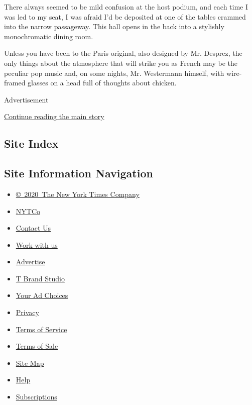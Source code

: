 There always seemed to be mild confusion at the host podium, and each
time I was led to my seat, I was afraid I'd be deposited at one of the
tables crammed into the narrow passageway. This hall opens in the back
into a stylishly monochromatic dining room.

Unless you have been to the Paris original, also designed by Mr.
Desprez, the only things about the atmosphere that will strike you as
French may be the peculiar pop music and, on some nights, Mr. Westermann
himself, with wire-framed glasses on a head full of thoughts about
chicken.

Advertisement

\protect\hyperlink{after-bottom}{Continue reading the main story}

\hypertarget{site-index}{%
\subsection{Site Index}\label{site-index}}

\hypertarget{site-information-navigation}{%
\subsection{Site Information
Navigation}\label{site-information-navigation}}

\begin{itemize}
\tightlist
\item
  \href{https://help.nytimes3xbfgragh.onion/hc/en-us/articles/115014792127-Copyright-notice}{©~2020~The
  New York Times Company}
\end{itemize}

\begin{itemize}
\tightlist
\item
  \href{https://www.nytco.com/}{NYTCo}
\item
  \href{https://help.nytimes3xbfgragh.onion/hc/en-us/articles/115015385887-Contact-Us}{Contact
  Us}
\item
  \href{https://www.nytco.com/careers/}{Work with us}
\item
  \href{https://nytmediakit.com/}{Advertise}
\item
  \href{http://www.tbrandstudio.com/}{T Brand Studio}
\item
  \href{https://www.nytimes3xbfgragh.onion/privacy/cookie-policy\#how-do-i-manage-trackers}{Your
  Ad Choices}
\item
  \href{https://www.nytimes3xbfgragh.onion/privacy}{Privacy}
\item
  \href{https://help.nytimes3xbfgragh.onion/hc/en-us/articles/115014893428-Terms-of-service}{Terms
  of Service}
\item
  \href{https://help.nytimes3xbfgragh.onion/hc/en-us/articles/115014893968-Terms-of-sale}{Terms
  of Sale}
\item
  \href{https://spiderbites.nytimes3xbfgragh.onion}{Site Map}
\item
  \href{https://help.nytimes3xbfgragh.onion/hc/en-us}{Help}
\item
  \href{https://www.nytimes3xbfgragh.onion/subscription?campaignId=37WXW}{Subscriptions}
\end{itemize}

